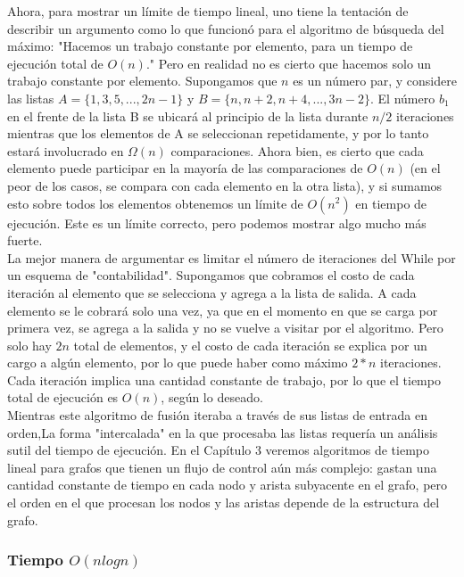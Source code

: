 \documentclass[a4paper, 12pt]{book}
\begin{document}
Ahora, para mostrar un límite de tiempo lineal, uno tiene la tentación de describir un argumento como lo que funcionó para el algoritmo de búsqueda del máximo: "Hacemos un trabajo constante por elemento, para un tiempo de ejecución total de $O(n)$." Pero en realidad no es cierto que hacemos solo un trabajo constante por elemento. Supongamos que $n$ es un número par, y considere las listas $A =\{ 1, 3, 5,. . . , 2n-1\}$ y $B =\{ n, n + 2, n + 4,. . . , 3n-2 \}$. El número $b_1$ en el frente de la lista B se ubicará al principio de la lista durante $n / 2$ iteraciones mientras que los elementos de A se seleccionan repetidamente, y por lo tanto estará involucrado en $\Omega(n)$ comparaciones. Ahora bien, es cierto que cada elemento puede participar en la mayoría de las comparaciones de $O(n)$ (en el peor de los casos, se compara con cada elemento en la otra lista), y si sumamos esto sobre todos los elementos obtenemos un límite de $O(n^2)$ en tiempo de ejecución. Este es un límite correcto, pero podemos mostrar algo mucho más fuerte.\\

La mejor manera de argumentar es limitar el número de iteraciones del While por un esquema de "contabilidad". Supongamos que cobramos el costo de cada iteración al elemento que se selecciona y agrega a la lista de salida. A cada elemento se le cobrará solo una vez, ya que en el momento en que se carga por primera vez, se agrega a la salida y no se vuelve a visitar por el algoritmo. Pero solo hay $2n$ total de elementos, y el costo de cada iteración se explica por un cargo a algún elemento, por lo que puede haber como máximo $2*n$ iteraciones. Cada iteración implica una cantidad constante de trabajo, por lo que el tiempo total de ejecución es $O(n)$, según lo deseado.\\

 Mientras este algoritmo de fusión iteraba a través de sus listas de entrada en orden,La forma "intercalada" en la que procesaba las listas requería un análisis  sutil del tiempo de ejecución. En el Capítulo 3 veremos algoritmos de tiempo lineal para grafos que tienen un flujo de control aún más complejo: gastan una cantidad constante de tiempo en cada nodo y arista subyacente en el grafo, pero el orden en el que procesan los nodos y las aristas depende de la estructura del grafo.\\

\subsubsection*{Tiempo $O(nlogn)$} 
\end{document}
